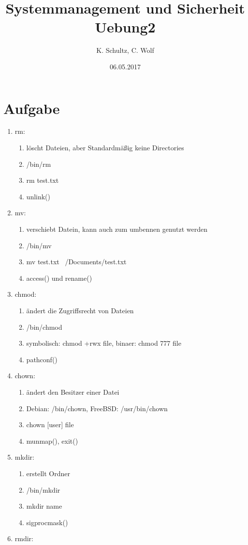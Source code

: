 \documentclass[11pt,a4paper,ngerman]{article}
\date{06.05.2017}
\author{K. Schultz, C. Wolf}
\title{Systemmanagement und Sicherheit Uebung2}
\begin{document}
\section{Aufgabe}
\begin{enumerate}
\item rm:
	\begin{enumerate}
		\item löscht Dateien, aber Standardmäßig keine Directories
		\item /bin/rm
		\item rm test.txt
		\item unlink()
	\end{enumerate}
\item mv:
	\begin{enumerate}
		\item verschiebt Datein, kann auch zum umbennen genutzt werden
		\item /bin/mv
		\item mv test.txt ~/Documents/test.txt
		\item access() und rename()
	\end{enumerate}
\item chmod:
	\begin{enumerate}
		\item \"andert die Zugriffsrecht von Dateien
		\item /bin/chmod
		\item symbolisch: chmod +rwx file, binaer: chmod 777 file
		\item pathconf()
	\end{enumerate}
\item chown:
	\begin{enumerate}
		\item \"andert den Besitzer einer Datei
		\item Debian: /bin/chown, FreeBSD: /usr/bin/chown
		\item chown [user] file
		\item munmap(), exit()
	\end{enumerate}
\item mkdir:
	\begin{enumerate}
		\item erstellt Ordner
		\item /bin/mkdir
		\item mkdir name
		\item sigprocmask()
	\end{enumerate}
\item rmdir:
	\begin{enumerate}

\end{enumerate}
\end{enumerate}
\end{document}
